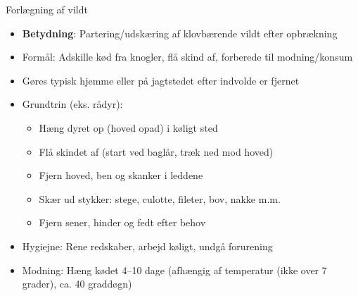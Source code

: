 \begin{frame}{Forlægning af vildt}
    \begin{itemize}
        \item \textbf{Betydning}: Partering/udskæring af klovbærende vildt efter opbrækning
        \item Formål: Adskille kød fra knogler, flå skind af, forberede til modning/konsum
        \item Gøres typisk hjemme eller på jagtstedet efter indvolde er fjernet
        \item Grundtrin (eks. rådyr):
          \begin{itemize}
            \item Hæng dyret op (hoved opad) i køligt sted
            \item Flå skindet af (start ved baglår, træk ned mod hoved)
            \item Fjern hoved, ben og skanker i leddene
            \item Skær ud stykker: stege, culotte, fileter, bov, nakke m.m.
            \item Fjern sener, hinder og fedt efter behov
          \end{itemize}
        \item Hygiejne: Rene redskaber, arbejd køligt, undgå forurening
        \item Modning: Hæng kødet 4–10 dage (afhængig af temperatur (ikke over 7 grader), ca. 40 graddøgn)
    \end{itemize}
\end{frame}